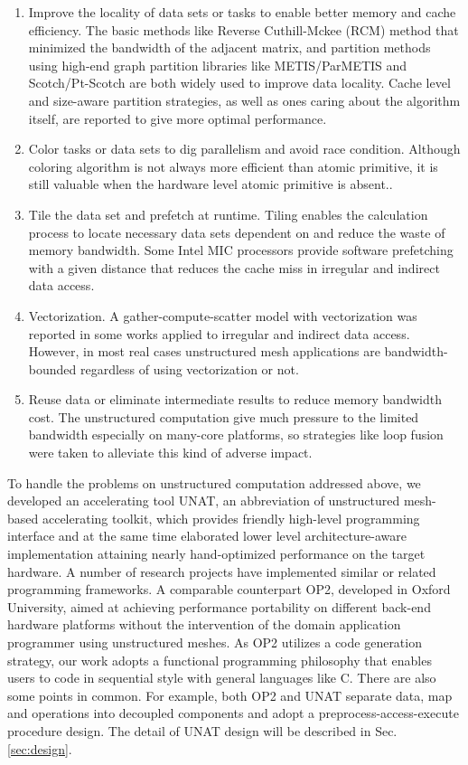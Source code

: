 \documentclass[5p,times]{elsarticle}
\begin{document}
\begin{enumerate}
\item Improve the locality of data sets or tasks to enable better memory and cache efficiency. The basic methods like Reverse Cuthill-Mckee (RCM) method that minimized the bandwidth of the adjacent matrix\cite{b7}\cite{b8-8}\cite{b14-14}, and partition methods\cite{b4}\cite{b12-12} using high-end graph partition libraries like METIS/ParMETIS and Scotch/Pt-Scotch\cite{b2} are both widely used to improve data locality. Cache level and size-aware partition strategies\cite{b2}\cite{b4}\cite{b12-12}, as well as ones caring about the algorithm itself\cite{b12-12}, are reported to give more optimal performance. 
\item Color tasks or data sets to dig parallelism and avoid race condition\cite{b2}\cite{b4}\cite{b7}\cite{b8-8}\cite{b18-18}. Although coloring algorithm is not always more efficient than atomic primitive, it is still valuable when the hardware level atomic primitive is absent.\cite{b18-18}.
\item Tile the data set and prefetch at runtime. Tiling enables the calculation process to locate necessary data sets dependent on and reduce the waste of memory bandwidth. Some Intel MIC processors provide software prefetching with a given distance that reduces the cache miss in irregular and indirect data access\cite{b7}\cite{b8}.
\item Vectorization. A gather-compute-scatter model with vectorization was reported in some works applied to irregular and indirect data access\cite{b7}\cite{b21-21}. However, in most real cases unstructured mesh applications are bandwidth-bounded regardless of using vectorization or not\cite{b21-21}.
\item Reuse data or eliminate intermediate results to reduce memory bandwidth cost. The unstructured computation give much pressure to the limited bandwidth especially on many-core platforms, so strategies like loop fusion\cite{b22-22} were taken to alleviate this kind of adverse impact.
\end{enumerate}

To handle the problems on unstructured computation addressed above, we developed an accelerating tool UNAT, an abbreviation of unstructured mesh-based accelerating toolkit, which provides friendly high-level programming interface and at the same time elaborated lower level architecture-aware implementation attaining nearly hand-optimized performance on the target hardware. A number of research projects have implemented similar or related programming frameworks. A comparable counterpart OP2\cite{b2}, developed in Oxford University, aimed at achieving performance portability on different back-end hardware platforms without the intervention of the domain application programmer using unstructured meshes. As OP2 utilizes a code generation strategy, our work adopts a functional programming philosophy that enables users to code in sequential style with general languages like C. There are also some points in common. For example, both OP2 and UNAT separate data, map and operations into decoupled components and adopt a preprocess-access-execute procedure design. The detail of UNAT design will be described in Sec. \ref{sec:design}.
\end{document}
